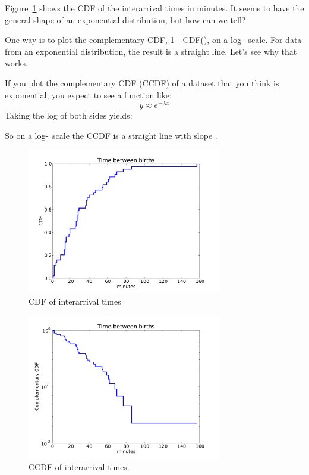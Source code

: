 \documentclass[12pt]{book}
\begin{document}
Figure~\ref{interarrival_cdf} shows the CDF of the interarrival times
in minutes.  It seems to have the general shape of an exponential
distribution, but how can we tell?

One way is to plot the complementary CDF, 1~\minus~CDF(\x), on a
log-\y~scale.  For data from an exponential distribution, the result
is a straight line.  Let's see why that works.

If you plot the complementary CDF (CCDF) of a dataset that you think is
exponential, you expect to see a function like:
%
\[ y \approx e^{-\lambda x} \]
%
Taking the log of both sides yields:


So on a log-\y~scale the CCDF is a straight line
with slope \minus\mylambda.

\begin{figure}
\centerline{\includegraphics[height=2.5in]{figs/interarrivals.pdf}}
\caption{CDF of interarrival times}
\label{interarrival_cdf}
\end{figure}

\begin{figure}
\centerline{\includegraphics[height=2.5in]{figs/interarrivals_logy.pdf}}
\caption{CCDF of interarrival times.}
\label{interarrival_ccdf}
\end{figure}
\end{document}
